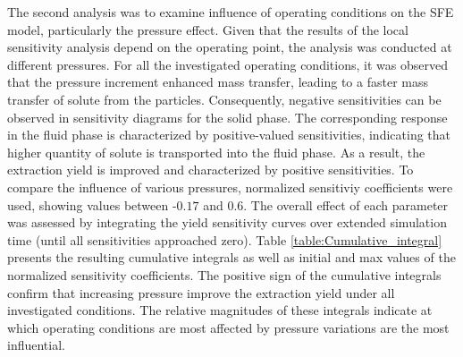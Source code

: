 \documentclass[a4paper,fleqn]{cas-dc}
\begin{document}
	The second analysis was to examine influence of operating conditions on the SFE model, particularly the pressure effect. Given that the results of the local sensitivity analysis depend on the operating point, the analysis was conducted at different pressures. For all the investigated operating conditions, it was observed that the pressure increment enhanced mass transfer, leading to a faster mass transfer of solute from the particles. Consequently, negative sensitivities can be observed in sensitivity diagrams for the solid phase. The corresponding response in the fluid phase is characterized by positive-valued sensitivities, indicating that higher quantity of solute is transported into the fluid phase. As a result, the extraction yield is improved and characterized by positive sensitivities. To compare the influence of various pressures, normalized sensitiviy coefficients were used, showing values between -$0.17$ and $0.6$. The overall effect of each parameter was assessed by integrating the yield sensitivity curves over extended simulation time (until all sensitivities approached zero). Table \ref{table:Cumulative_integral} presents the resulting cumulative integrals as well as initial and max values of the normalized sensitivity coefficients. The positive sign of the cumulative integrals confirm that increasing pressure improve the extraction yield under all investigated conditions. The relative magnitudes of these integrals indicate at which operating conditions are most affected by pressure variations are the most influential. 
	
	\begin{table}[h!]
		\caption{Values of the cumulative integral of the yield sensitivity}
		\label{table:Cumulative_integral}
	\end{table}
	
\end{document}
